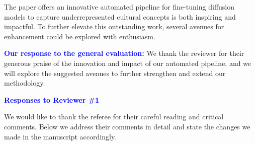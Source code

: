 \documentclass[11pt]{article}
\begin{document}
The paper offers an innovative automated pipeline for fine-tuning diffusion models to capture underrepresented cultural concepts is both inspiring and impactful. To further elevate this outstanding work, several avenues for enhancement could be explored with enthusiasm.

{\bf \textcolor{blue}{Our response to the general evaluation:}} We thank the reviewer for their generous praise of the innovation and impact of our automated pipeline, and we will explore the suggested avenues to further strengthen and extend our methodology.


\vspace{0.2cm}

\begin{center}
\textcolor{blue}{{\bf Responses to Reviewer \#1}}
\end{center}
{
We would like to thank the referee for their careful reading and critical comments. Below we address their comments in detail and state the changes we made in the manuscript accordingly.
}
\end{document}
